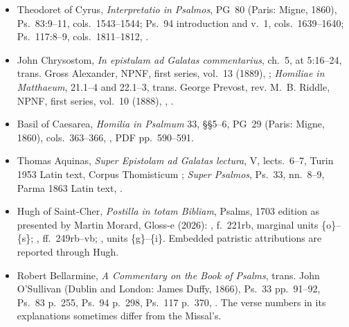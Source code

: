 {\begin{itemize}[leftmargin=1.1em,labelsep=0.35em,itemsep=0.22em,topsep=0.15em,parsep=0pt]
\item Theodoret of Cyrus, \emph{Interpretatio in Psalmos}, PG~80
(Paris: Migne, 1860), Ps.~83:9--11, cols.~1543--1544;
Ps.~94 introduction and v.~1, cols.~1639--1640;
Ps.~117:8--9, cols.~1811--1812,
.

\item John Chrysostom, \emph{In epistulam ad Galatas commentarius}, ch.~5,
at 5:16--24, trans. Gross Alexander, NPNF, first series, vol.~13 (1889),
;
\emph{Homiliae in Matthaeum}, 21.1--4 and 22.1--3, trans. George Prevost,
rev. M.~B. Riddle, NPNF, first series, vol.~10 (1888),
,
.

\item Basil of Caesarea, \emph{Homilia in Psalmum} 33, §§5--6,
PG~29 (Paris: Migne, 1860), cols.~363--366,
,
PDF pp.~590--591.

\item Thomas Aquinas, \emph{Super Epistolam ad Galatas lectura}, V,
lects.~6--7, Turin 1953 Latin text, Corpus Thomisticum
;
\emph{Super Psalmos}, Ps.~33, nn.~8--9, Parma 1863 Latin text,
.

\item Hugh of Saint-Cher, \emph{Postilla in totam Bibliam}, Psalms,
1703 edition as presented by Martin Morard, Gloss-e (2026):
,
f.~221rb, marginal units \{o\}--\{s\};
,
ff.~249rb--vb;
,
units \{g\}--\{i\}. Embedded patristic attributions are reported through Hugh.

\item Robert Bellarmine, \emph{A Commentary on the Book of Psalms}, trans.
John O'Sullivan (Dublin and London: James Duffy, 1866), Ps.~33 pp.~91--92,
Ps.~83 p.~255, Ps.~94 p.~298, Ps.~117 p.~370,
.
The verse numbers in its explanations sometimes differ from the Missal's.


\end{itemize}}
